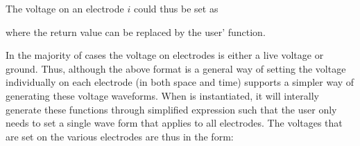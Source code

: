 \documentclass[letterpaper,10pt,english]{sphinxmanual}
\begin{document}
The voltage on an electrode \(i\) could thus be set as

\begin{sphinxVerbatim}[commandchars=\\\{\},formatcom=\scriptsize]
 

   \PYG{p}{[}\PYG{p}{]}       
     

 
\end{sphinxVerbatim}

where the return value can be replaced by the user’ function.

In the majority of cases the voltage on electrodes is either a live voltage or ground.
Thus, although the above format is a general way of setting the voltage individually on each electrode (in both space and time)  supports a simpler way of generating these voltage waveforms.
When  is instantiated, it will interally generate these functions through simplified expression such that the user only needs to set a single wave form that applies to all electrodes.
The voltages that are set on the various electrodes are thus in the form:

\begin{sphinxVerbatim}[commandchars=\\\{\},formatcom=\scriptsize]
 
 
   

   \PYG{p}{[}\PYG{p}{]}       
      

 
\end{sphinxVerbatim}
\end{document}
